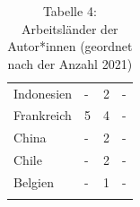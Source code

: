 \documentclass[a4paper,
fontsize=11pt,
oneside,
numbers=noperiodatend,
parskip=half-,
bibliography=totoc,
final
]{scrartcl}
\begin{document}
\begin{longtable}{llll}
Indonesien                & -                    & 2                    & -                    \\
Frankreich                & 5                    & 4                    & -                    \\
China                     & -                    & 2                    & -                    \\
Chile                     & -                    & 2                    & -                    \\
Belgien                   & -                    & 1                    & -               \\
\caption{Tabelle 4: Arbeitsländer der Autor*innen (geordnet nach der Anzahl 2021)}\\    
\end{longtable}
\end{document}
